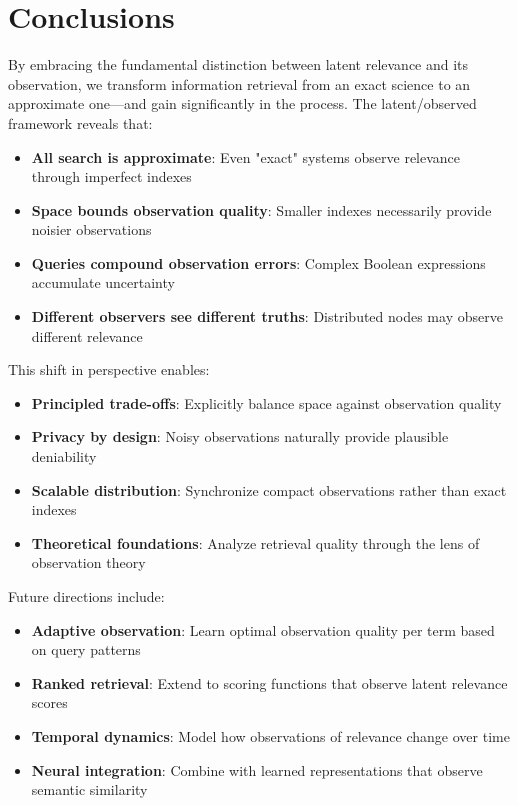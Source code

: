 \documentclass[11pt,final,hidelinks]{article}
\begin{document}
\section{Conclusions}

By embracing the fundamental distinction between latent relevance and its observation, we transform information retrieval from an exact science to an approximate one—and gain significantly in the process. The latent/observed framework reveals that:

\begin{itemize}
    \item \textbf{All search is approximate}: Even "exact" systems observe relevance through imperfect indexes
    \item \textbf{Space bounds observation quality}: Smaller indexes necessarily provide noisier observations
    \item \textbf{Queries compound observation errors}: Complex Boolean expressions accumulate uncertainty
    \item \textbf{Different observers see different truths}: Distributed nodes may observe different relevance
\end{itemize}

This shift in perspective enables:
\begin{itemize}
    \item \textbf{Principled trade-offs}: Explicitly balance space against observation quality
    \item \textbf{Privacy by design}: Noisy observations naturally provide plausible deniability
    \item \textbf{Scalable distribution}: Synchronize compact observations rather than exact indexes
    \item \textbf{Theoretical foundations}: Analyze retrieval quality through the lens of observation theory
\end{itemize}

Future directions include:
\begin{itemize}
    \item \textbf{Adaptive observation}: Learn optimal observation quality per term based on query patterns
    \item \textbf{Ranked retrieval}: Extend to scoring functions that observe latent relevance scores
    \item \textbf{Temporal dynamics}: Model how observations of relevance change over time
    \item \textbf{Neural integration}: Combine with learned representations that observe semantic similarity
\end{itemize}
\end{document}
